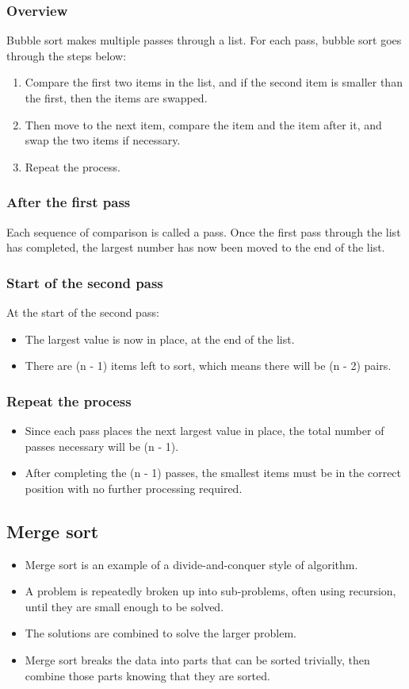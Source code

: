 \documentclass[11pt]{article}
\begin{document}
\subsubsection{Overview}
\label{sec:org5f47cc1}
Bubble sort makes multiple passes through a list. For each pass, bubble sort goes through the steps below:
\begin{enumerate}
\item Compare the first two items in the list, and if the second item is smaller than the first, then the items are swapped.
\item Then move to the next item, compare the item and the item after it, and swap the two items if necessary.
\item Repeat the process.
\end{enumerate}
\subsubsection{After the first pass}
\label{sec:orgaed1717}
Each sequence of comparison is called a pass. Once the first pass through the list has completed, the largest number has now been moved to the end of the list.
\subsubsection{Start of the second pass}
\label{sec:org9883214}
At the start of the second pass:
\begin{itemize}
\item The largest value is now in place, at the end of the list.
\item There are (n - 1) items left to sort, which means there will be (n - 2) pairs.
\end{itemize}
\subsubsection{Repeat the process}
\label{sec:org8fc1eae}
\begin{itemize}
\item Since each pass places the next largest value in place, the total number of passes necessary will be (n - 1).
\item After completing the (n - 1) passes, the smallest items must be in the correct position with no further processing required.
\end{itemize}

 \newpage
\subsection{Merge sort}
\label{sec:org32ac69e}
\begin{itemize}
\item Merge sort is an example of a divide-and-conquer style of algorithm.
\item A problem is repeatedly broken up into sub-problems, often using recursion, until they are small enough to be solved.
\item The solutions are combined to solve the larger problem.
\item Merge sort breaks the data into parts that can be sorted trivially, then combine those parts knowing that they are sorted.
\end{itemize}
\end{document}
